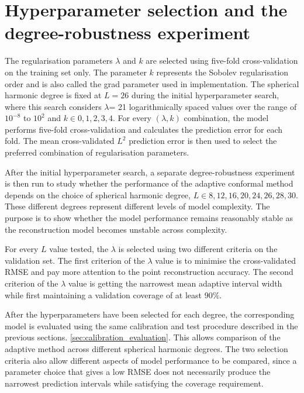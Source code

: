 \section{Hyperparameter selection and the degree-robustness experiment}
\label{sec:hyperparam-degree}

The regularisation parameters $\lambda$ and $k$ are selected using five-fold cross-validation on the training set only. The parameter $k$ represents the Sobolev regularisation order and is also called the grad parameter used in implementation. The spherical harmonic degree is fixed at $L=26$ during the initial hyperparameter search, where this search considers $\lambda$= 21 logarithmically spaced values over the range of $10^{-8}$ to $10^{2}$ and $k\in{0,1,2,3,4}$. For every $(\lambda,k)$ combination, the model performs five-fold cross-validation and calculates the prediction error for each fold. The mean cross-validated $L^2$ prediction error is then used to select the preferred combination of regularisation parameters.
 
After the initial hyperparameter search, a separate degree-robustness experiment is then run to study whether the performance of the adaptive conformal method depends on the choice of spherical harmonic degree, $L\in{8,12,16,20,24,26,28,30}$. These different degrees represent different levels of model complexity. The purpose is to show whether the model performance remains reasonably stable as the reconstruction model becomes unstable across complexity.

For every $L$ value tested, the $\lambda$ is selected using two different criteria on the validation set. The first criterion of the $\lambda$ value is to minimise the cross-validated RMSE and pay more attention to the point reconstruction accuracy. The second criterion of the $\lambda$ value is getting the narrowest mean adaptive interval width while first maintaining a validation coverage of at least $90\%$. 

After the hyperparameters have been selected for each degree, the corresponding model is evaluated using the same calibration and test procedure described in the previous sections. \cref{sec:calibration_evaluation}. This allows comparison of the adaptive method across different spherical harmonic degrees. The two selection criteria also allow different aspects of model performance to be compared, since a parameter choice that gives a low RMSE does not necessarily produce the narrowest prediction intervals while satisfying the coverage requirement. 

